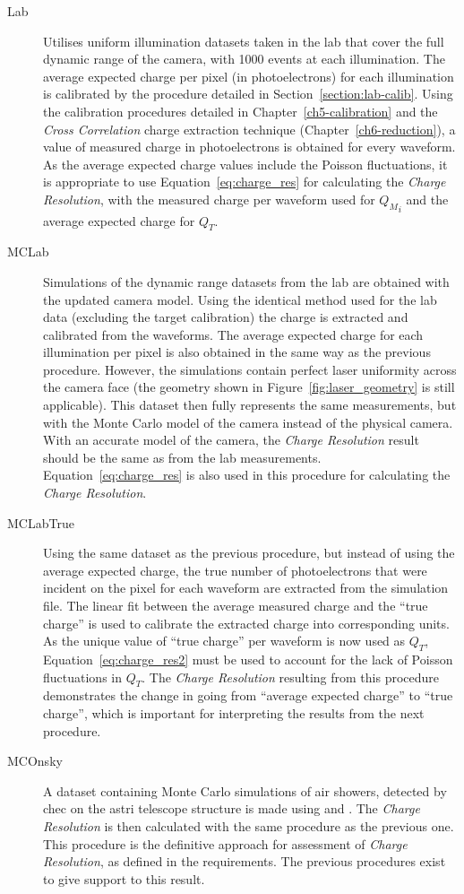 \begin{description}
\item [Lab] Utilises uniform illumination datasets taken in the lab that cover the full dynamic range of the camera, with 1000 events at each illumination. The average expected charge per pixel (in photoelectrons) for each illumination is calibrated by the procedure detailed in Section~\ref{section:lab-calib}. Using the calibration procedures detailed in Chapter~\ref{ch5-calibration} and the \textit{Cross Correlation} charge extraction technique (Chapter~\ref{ch6-reduction}), a value of measured charge in photoelectrons is obtained for every waveform. As the average expected charge values include the Poisson fluctuations, it is appropriate to use Equation~\ref{eq:charge_res} for calculating the \textit{Charge Resolution}, with the measured charge per waveform used for ${Q_M}_i$ and the average expected charge for $Q_T$.
\item [MCLab] Simulations of the dynamic range datasets from the lab are obtained with the updated  camera model. Using the identical method used for the lab data (excluding the \gls{target} calibration) the charge is extracted and calibrated from the waveforms. The average expected charge for each illumination per pixel is also obtained in the same way as the previous procedure. However, the simulations contain perfect laser uniformity across the camera face (the geometry shown in Figure~\ref{fig:laser_geometry} is still applicable). This dataset then fully represents the same measurements, but with the Monte Carlo model of the camera instead of the physical camera. With an accurate model of the camera, the \textit{Charge Resolution} result should be the same as from the lab measurements. Equation~\ref{eq:charge_res} is also used in this procedure for calculating the \textit{Charge Resolution}.
\item [MCLabTrue] Using the same dataset as the previous procedure, but instead of using the average expected charge, the true number of photoelectrons that were incident on the pixel for each waveform are extracted from the simulation file. The linear fit between the average measured charge and the ``true charge'' is used to calibrate the extracted charge into corresponding units. As the unique value of ``true charge'' per waveform is now used as $Q_T$, Equation~\ref{eq:charge_res2} must be used to account for the lack of Poisson fluctuations in $Q_T$. The \textit{Charge Resolution} resulting from this procedure demonstrates the change in going from ``average expected charge'' to ``true charge'', which is important for interpreting the results from the next procedure.
\item [MCOnsky] A dataset containing Monte Carlo simulations of air showers, detected by \gls{chec} on the \gls{astri} telescope structure is made using  and . The \textit{Charge Resolution} is then calculated with the same procedure as the previous one. This procedure is the definitive approach for assessment of \textit{Charge Resolution}, as defined in the requirements. The previous procedures exist to give support to this result.
\end{description}


